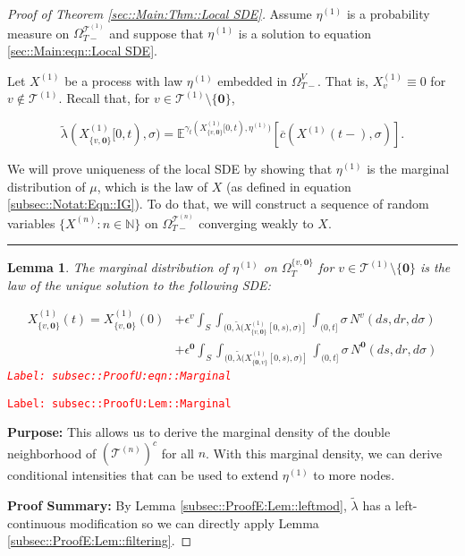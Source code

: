 \documentclass[12pt]{article}
\newcommand{\mb}{\mathbb}
\newcommand{\mc}{\mathcal}
\newcommand{\ov}{\overline}
\newcommand{\ep}{\epsilon}
\newcommand{\tr}{\textcolor{red}}
\newcommand{\labe}[1]{\tr{\texttt{Label: #1}}}
\newcommand{\purpose}{\textbf{Purpose: }}
\newcommand{\pfsum}{\textbf{Proof Summary: }}
\newcommand{\ind}{\hspace{24pt}}
\newcommand{\lin}{\rule{\linewidth}{0.4 pt}}
\newcommand{\exmu}[2]{\mb{E}^{#1}\left[#2\right]}	%
\renewcommand{\root}{\mathbf{0}}				%
\renewcommand{\v}{v}							%
\renewcommand{\S}{S}							%
\newcommand{\s}{\sigma}							%
\newcommand{\ev}{\ep}							%
\newcommand{\T}{T}								%
\renewcommand{\t}{t}							%
\newcommand{\sset}{\Omega}						%
\renewcommand{\tt}{s}							%
\newcommand{\X}{X}								%
\newcommand{\vind}[1]{^{#1}}					%
\newcommand{\vsi}[1]{^{#1}}						%
\newcommand{\cind}[1]{_{#1}}					%
\newcommand{\tp}[1]{(#1)}						%
\newcommand{\tip}[1]{#1}						%
\newcommand{\ts}[1]{_{#1}}						%
\newcommand{\IGrg}{\ov{c}}						%
\newcommand{\tree}{\mc{T}}						%
\newcommand{\sln}[1]{^{(#1)}}					%
\newcommand{\poiss}{N}							%
\renewcommand{\r}{r}							%
\newcommand{\alt}[1]{\widetilde{#1}}			%
\newcommand{\m}{\mu}							%
\newcommand{\mmm}{\eta}							%
\newcommand{\cm}{\gamma}						%
\newcommand{\crate}{\alt{\lambda}}				%
\newtheorem{lem}[thms]{Lemma}
\begin{document}
\begin{proof}[Proof of Theorem \ref{sec::Main:Thm::Local SDE}]

Assume \(\mmm\sln{1}\) is a probability measure on \(\sset\vsi{\tree\sln{1}}\ts{\T-}\) and suppose that \(\mmm\sln{1}\) is a solution to equation \eqref{sec::Main:eqn::Local SDE}.

\ind Let \(\X\sln{1}\) be a process with law \(\mmm\sln{1}\) embedded in \(\sset\vsi{V}\ts{\T-}\). That is, \(\X\sln{1}\cind{\v} \equiv 0\) for \(\v \notin \tree\sln{1}\). Recall that, for \(\v \in \tree\sln{1}\setminus\{\root\}\),

\[\crate(\X\sln{1}\cind{\{\v,\root\}}\tip{[0,\t)},\s) = \exmu{\cm\ts{\t}(\X\sln{1}\cind{\{\v,\root\}}\tip{[0,\t)},\mmm\sln{1})}{\IGrg{}(\X\sln{1}\tp{\t-},\s)}.\]

\ind We will prove uniqueness of the local SDE by showing that \(\mmm\sln{1}\) is the marginal distribution of \(\m\), which is the law of \(\X\) (as defined in equation \eqref{subsec::Notat:Eqn::IG}). To do that, we will construct a sequence of random variables \(\{\X\sln{n}:n\in\mb{N}\}\) on \(\sset\vsi{\tree\sln{n}}\ts{\T-}\) converging weakly to \(\X\). 

\lin

\begin{lem}
The marginal distribution of \(\mmm\sln{1}\) on \(\sset\vsi{\{\v,\root\}}\ts{\T}\) for \(\v \in \tree\sln{1}\setminus\{\root\}\) is the law of the unique solution to the following SDE:

\begin{align}
\X\sln{1}\cind{\{\v,\root\}}\tp{\t} = \X\sln{1}\cind{\{\v,\root\}}\tp{0} &+ \ev\vind{\v}\int_\S\int_{(0,\crate(\X\sln{1}\cind{\{\v,\root\}}\tip{[0,\tt)},\s)]}\int_{(0,\t]}\s\,\poiss\vind{\v}(d\tt,d\r,d\s)\nonumber\\
&+ \ev\vind{\root}\int_\S\int_{(0,\crate(\X\sln{1}\cind{\{\root,\v\}}\tip{[0,\tt)},\s)]}\int_{(0,\t]}\s\,\poiss\vind{\root}(d\tt,d\r,d\s)
\label{subsec::ProofU:eqn::Marginal}
\end{align}
\labe{subsec::ProofU:eqn::Marginal}
\label{subsec::ProofU:Lem::Marginal}
\end{lem}
\labe{subsec::ProofU:Lem::Marginal}

\purpose This allows us to derive the marginal density of the double neighborhood of \((\tree\sln{n})^c\) for all \(n\). With this marginal density, we can derive conditional intensities that can be used to extend \(\mmm\sln{1}\) to more nodes.

\pfsum By Lemma \ref{subsec::ProofE:Lem::leftmod}, \(\crate\) has a left-continuous modification so we can directly apply Lemma \ref{subsec::ProofE:Lem::filtering}.


\end{proof}
\end{document}
